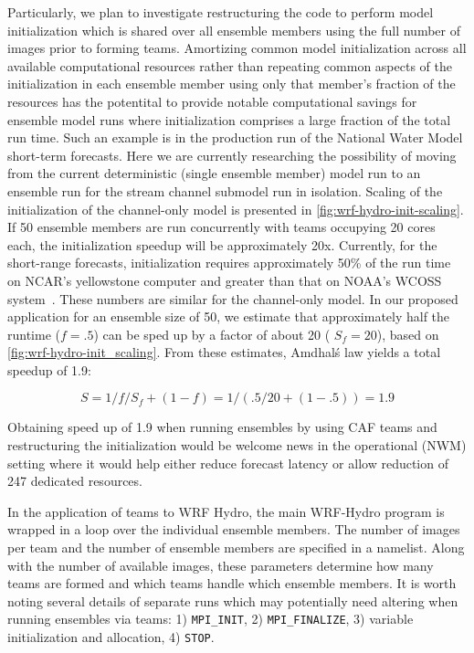 Particularly, we plan to investigate restructuring the code to perform
model initialization which is shared over all ensemble members using
the full number of images prior to forming teams. Amortizing common
model initialization across all available computational resources
rather than repeating common aspects of the initialization in each
ensemble member using only that member's fraction of the resources has
the potentital to provide notable computational savings for
ensemble model runs where initialization comprises a large fraction of
the total run time. Such an example is in the production run of the
National Water Model short-term forecasts. Here we are currently
researching the possibility of moving from the current deterministic
(single ensemble member) model run to an ensemble run for the stream
channel submodel run in isolation. Scaling of the
initialization of the channel-only model is presented in
\ref{fig:wrf-hydro-init-scaling}. If 50 ensemble members are run concurrently with
teams occupying 20 cores each, the initialization speedup will be
approximately 20x. Currently, for the short-range forecasts,
initialization requires approximately 50\% of the run time on
NCAR's yellowstone computer and greater than that on NOAA's WCOSS
system~\cite{yuetal2017}. These numbers are
similar for the channel-only model. In our proposed application for an ensemble size of 50, we estimate that
approximately half the runtime ($f=.5$) can be sped up by a factor of
about 20 ( $S_f=20$), based on \ref{fig:wrf-hydro-init_scaling}. From
these estimates, Amdhal\'s law yields a total speedup
of 1.9:

\begin{equation}
S = 1 / { f/S_f + (1-f) } = 1 / (.5/20 + (1-.5)) = 1.9
\end{equation}

Obtaining speed up of 1.9 when running ensembles by using CAF
teams and restructuring the initialization would be welcome news in the
operational (NWM) setting where it would help either reduce forecast latency
or allow reduction of 24\/7 dedicated resources.

In the application of teams to WRF Hydro, the main WRF-Hydro program is wrapped in a loop
over the individual ensemble members. The number of images per team and the
 number of ensemble members are specified in a namelist. Along with
 the number of available images, these parameters determine how many
 teams are formed and which teams handle which ensemble members. It is
 worth noting several details of separate runs which may potentially need altering
 when running ensembles via teams: 1) \texttt{MPI\_INIT}, 2) \texttt{MPI\_FINALIZE}, 3)
 variable initialization and allocation, 4) \texttt{STOP}.

